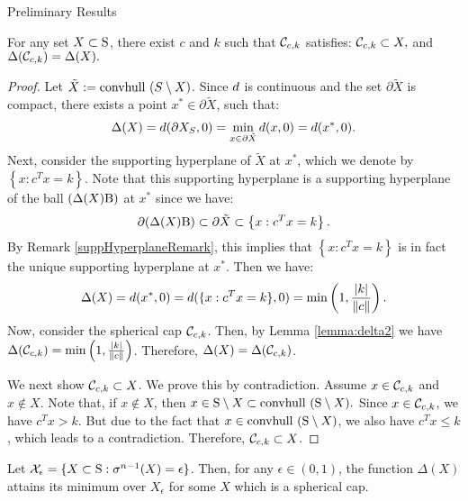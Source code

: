 \begin{subsection}{Preliminary Results}
\begin{lemma}\label{lemma:constructSC}For any set $X \subset \text{S}$, there exist $c$ and $k$ such that $\mathcal{C}_{c,k}$ satisfies: $\mathcal{C}_{c,k} \subset X,$ and $\Delta(\mathcal{C}_{c,k}) = \Delta(X).$
\end{lemma}

\begin{proof} Let $\tilde{X} := \mbox{convhull }(S \setminus X)$.
Since $d$ is continuous and the set $\partial \tilde{X}$ is compact, there exists a point $x^* \in \partial \tilde{X}$, such that:
\begin{eqnarray}\nonumber \Delta(X) = d(\partial X_S, 0) = 
\label{deltaSupporting} \min_{x \in \partial \tilde{X}}d(x, 0) = d(x^*, 0).\end{eqnarray} 
Next, consider the supporting hyperplane of $\tilde{X}$ at $x^*$, which we denote by $\left\{x : c^Tx = k\right\}$. Note that this supporting hyperplane is a supporting hyperplane of the ball $(\Delta(X)\text{B})$ at $x^*$ since we have:
\begin{equation*} \partial (\Delta(X)\text{B}) \subset \partial \tilde{X} \subset \left\{x : c^Tx = k\right\}.\end{equation*}  By Remark \ref{suppHyperplaneRemark}, this implies that $\left\{x : c^Tx = k\right\}$ is in fact the unique supporting hyperplane at $x^*$.
Then we have:
\begin{equation*}\Delta(X) =  d(x^*, 0) = d(\{x : c^Tx = k\}, 0) = \min\left(1, \frac{|k|}{\|c\|}\right).
\end{equation*}
Now, consider the spherical cap $\mathcal{C}_{c,k}$. Then, by Lemma \ref{lemma:delta2} we have
$\Delta(\mathcal{C}_{c,k}) =  \min\left(1, \frac{|k|}{\|c\|}\right)$. Therefore, $\Delta(X) = \Delta(\mathcal{C}_{c,k})$.


We next show $\mathcal{C}_{c, k} \subset X$. We prove this by contradiction. Assume $x \in \mathcal{C}_{c,k}$ and $x \notin X$. Note that, if $x \notin X$, then $x \in \text{S} \setminus X \subset \mbox{convhull }(\text{S} \setminus X).$ Since $x \in \mathcal{C}_{c,k}$, we have $c^Tx>k$. But due to the fact that $x \in \mbox{convhull }(\text{S} \setminus X)$, we also have $c^Tx \leq k$, which leads to a contradiction. Therefore, $\mathcal{C}_{c, k} \subset X$. 
\end{proof}

\begin{proposition}\label{thm:mainSphericalCap}Let $\mathcal{X}_{\epsilon} = \{X \subset \text{S}: \sigma^{n-1}(X) = \epsilon\}$. Then, for any $\epsilon \in (0,1)$, the function $\Delta(X)$ attains its minimum over $X_{\epsilon}$ for some $X$ which is a spherical cap.
\end{proposition}


\end{subsection}
